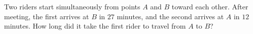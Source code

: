 Two riders start simultaneously from points $A$ and $B$ toward each other. After meeting, the first arrives at $B$ in $27$ minutes, and the second arrives at $A$ in $12$ minutes. How long did it take the first rider to travel from $A$ to $B$?
